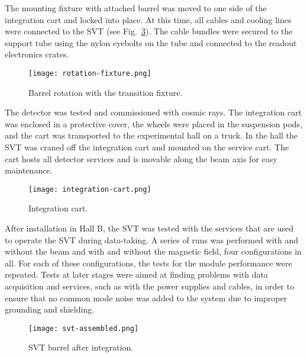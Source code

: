 The mounting fixture with attached barrel was moved to one side of the integration cart and locked into place. At this time, all cables and cooling lines were connected to the SVT (see Fig.~\ref{fig:svt-assembled}). The cable bundles were secured to the support tube using the nylon eyebolts on the tube and connected to the readout electronics crates. 

\begin{figure}[hbt] 
\centering 
\texttt{[image: rotation-fixture.png]}
\caption{Barrel rotation with the transition fixture.}
\label{fig:rotation-fixture}
\end{figure}

The detector was tested and commissioned with cosmic rays. The integration cart was enclosed in a protective cover, the wheels were placed in the suspension pods, and the cart was transported to the experimental hall on a truck. In the hall the SVT was craned off the integration cart and mounted on the service cart. The cart hosts all detector services and is movable along the beam axis for easy maintenance.

\begin{figure}[hbt] 
\centering 
\texttt{[image: integration-cart.png]}
\caption{Integration cart.}
\label{fig:integration-cart}
\end{figure}

After installation in Hall B, the SVT was tested with the services that are used to operate the SVT during data-taking. A series of runs was performed with and without the beam and with and without the magnetic field, four configurations in all. For each of these configurations, the tests for the module performance were repeated. Tests at later stages were aimed at finding problems with data acquisition and services, such as with the power supplies and cables, in order to ensure that no common mode noise was added to the system due to improper grounding and shielding. 

\begin{figure}[hbt] 
\centering 
\texttt{[image: svt-assembled.png]}
\caption{SVT barrel after integration.}
\label{fig:svt-assembled}
\end{figure}
